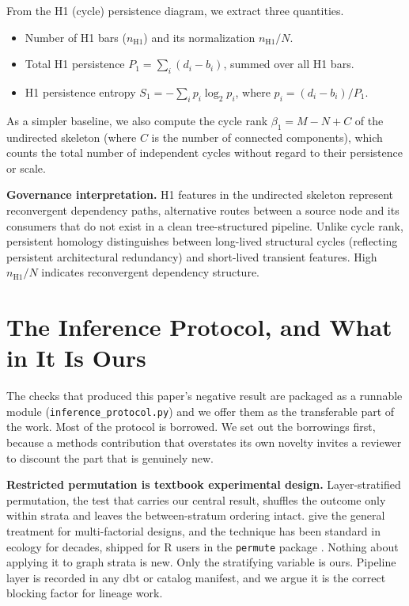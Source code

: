 \documentclass[11pt,a4paper]{article}
\begin{document}
From the H1 (cycle) persistence diagram, we extract three quantities.

\begin{itemize}
  \item Number of H1 bars ($n_{\text{H1}}$) and its normalization
        $n_{\text{H1}} / N$.
  \item Total H1 persistence $P_1 = \sum_i (d_i - b_i)$, summed over all
        H1 bars.
  \item H1 persistence entropy $S_1 = -\sum_i p_i \log_2 p_i$, where
        $p_i = (d_i - b_i) / P_1$.
\end{itemize}

As a simpler baseline, we also compute the cycle rank $\beta_1 = M - N + C$
of the undirected skeleton (where $C$ is the number of connected
components), which counts the total number of independent cycles without
regard to their persistence or scale.

\textbf{Governance interpretation.} H1 features in the undirected
skeleton represent reconvergent dependency paths, alternative routes
between a source node and its consumers that do not exist in a clean
tree-structured pipeline. Unlike cycle rank, persistent homology
distinguishes between long-lived structural cycles (reflecting
persistent architectural redundancy) and short-lived transient features.
High $n_{\text{H1}} / N$ indicates reconvergent dependency structure.

\section{The Inference Protocol, and What in It Is Ours}
\label{sec:protocol}

The checks that produced this paper's negative result are packaged as a
runnable module (\texttt{inference\_protocol.py}) and we offer them as
the transferable part of the work. Most of the protocol is borrowed. We
set out the borrowings first, because a methods contribution that
overstates its own novelty invites a reviewer to discount the part that
is genuinely new.

\textbf{Restricted permutation is textbook experimental design.}
Layer-stratified permutation, the test that carries our central result,
shuffles the outcome only within strata and leaves the between-stratum
ordering intact. \citet{anderson2003permutation} give the general
treatment for multi-factorial designs, and the technique has been
standard in ecology for decades, shipped for R users in the
\texttt{permute} package \citep{simpson2026permute}. Nothing about
applying it to graph strata is new. Only the stratifying variable is
ours. Pipeline layer is recorded in any dbt or catalog manifest, and we
argue it is the correct blocking factor for lineage work.
\end{document}
